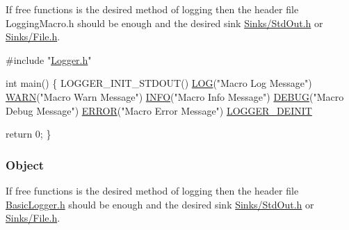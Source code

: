 If free functions is the desired method of logging then the header file {\ttfamily Logging\+Macro.\+h} should be enough and the desired sink {\ttfamily \hyperlink{_std_out_8h}{Sinks/\+Std\+Out.\+h}} or {\ttfamily \hyperlink{_file_8h}{Sinks/\+File.\+h}}.


\begin{DoxyCode}
\textcolor{preprocessor}{#include "\hyperlink{_logger_8h}{Logger.h}"}

\textcolor{keywordtype}{int} main()
\{
    LOGGER\_INIT\_STDOUT()
    \hyperlink{_logging_macros_8h_a018a1fe4b078f1a684610657a5848860}{LOG}("Macro Log Message")
    \hyperlink{_logging_macros_8h_a5dd0aa9e28b0c7db286181cfc81ebb94}{WARN}("Macro Warn Message")
    \hyperlink{_logging_macros_8h_aafc148cee6d6c9e76b4ef417c7056f8f}{INFO}("Macro Info Message")
    \hyperlink{_logging_macros_8h_a614c336056da6e8a7e6a06ed991b9feb}{DEBUG}("Macro Debug Message")
    \hyperlink{_logging_macros_8h_a78e40dfd87f516e322340d249027aea1}{ERROR}("Macro Error Message")
    \hyperlink{_logging_macros_8h_a949408ae41659956042cdbe1e59281f3}{LOGGER\_DEINIT}

    return 0;
\}
\end{DoxyCode}


\subsubsection*{Object}

If free functions is the desired method of logging then the header file {\ttfamily \hyperlink{_basic_logger_8h}{Basic\+Logger.\+h}} should be enough and the desired sink {\ttfamily \hyperlink{_std_out_8h}{Sinks/\+Std\+Out.\+h}} or {\ttfamily \hyperlink{_file_8h}{Sinks/\+File.\+h}}.


